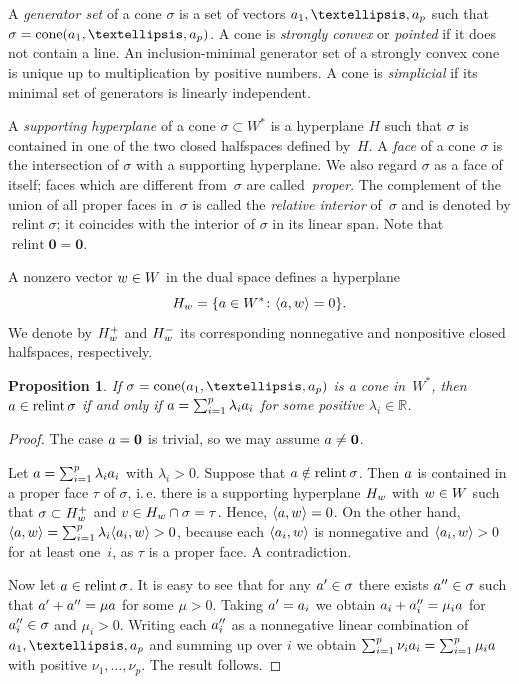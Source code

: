 \documentclass[a4paper]{amsart}
\newtheorem{proposition}[theorem]{Proposition}
\theoremstyle{definition}
\theoremstyle{remark}
\numberwithin{equation}{section}
\def\R{\mathbb R}
\def\R{\mathbb R}
\newcommand{\mb}[1]{{\textbf {\textit#1}}}
\def\cone{\mathop{\mathrm{cone}}}
\def\relint{\mathop{\mathrm{relint}}}
\newcommand{\<}{\langle}
\renewcommand{\>}{\rangle}
\begin{document}
A \emph{generator set} of a cone $\sigma$ is a set of vectors $\mb a_1,\ldots,\mb a_p$ such that $\sigma=\cone(\mb a_1,\ldots,\mb a_p)$. A cone is \emph{strongly convex} or \emph{pointed} if it does not contain a line.  An inclusion-minimal generator set of a strongly convex cone is unique up to multiplication by positive numbers. A cone is \emph{simplicial} if its minimal set of generators is linearly independent.

A \emph{supporting hyperplane} of a cone $\sigma\subset W^*$ is a hyperplane $H$ such that $\sigma$ is contained in one of the two closed halfspaces defined by~$H$. A \emph{face} of a cone $\sigma$ is the intersection of $\sigma$ with a supporting hyperplane. We also regard $\sigma$ as a face of itself; faces which are different from~$\sigma$ are called~\emph{proper}. The complement of the union of all proper faces in~$\sigma$ is called the \emph{relative interior} of~$\sigma$ and is denoted by $\relint\sigma$; it coincides with the interior of $\sigma$ in its linear span.
Note that $\relint{\mathbf 0}=\mathbf 0$.

A nonzero vector $\mb w\in W$ in the dual space defines a hyperplane
\[
  H_{\mb w}=\{\mb a\in W^*\colon\langle\mb a,\mb w\rangle=0\}.
\]   
We denote by $H_{\mb w}^+$ and $H_{\mb w}^-$ its corresponding nonnegative and nonpositive closed halfspaces, respectively. %

\begin{proposition}\label{positive}
If $\sigma=\cone(\mb a_1,\ldots,\mb a_p)$ is a cone in~$W^*$, then $\mb a\in\relint\sigma$ if and only if $\mb a=\sum_{i=1}^p \lambda_i\mb a_i$ for some positive $\lambda_i\in\R$.
\end{proposition}
\begin{proof}
The case $\mb a=\mathbf0$ is trivial, so we may assume $\mb a\ne\mathbf 0$.

Let $\mb a=\sum_{i=1}^p \lambda_i\mb a_i$ with $\lambda_i>0$. Suppose that $\mb a\notin\relint\sigma$. Then $\mb a$ is contained in a proper face $\tau$ of $\sigma$, i.\,e. there is a supporting hyperplane $H_{\mb w}$ with $\mb w\in W$ such that 
$\sigma\subset H_{\mb w}^+$ and $\mb v\in H_{\mb w}\cap\sigma=\tau$. Hence, $\langle\mb a,\mb w\rangle=0$. On the other hand, $\langle\mb a,\mb w\rangle=\sum_{i=1}^p \lambda_i\langle\mb a_i,\mb w\rangle>0$, because each $\langle\mb a_i,\mb w\rangle$ is nonnegative and $\langle\mb a_i,\mb w\rangle>0$ for at least one~$i$, as $\tau$ is a proper face. A contradiction.

Now let $\mb a\in\relint\sigma$. It is easy to see that for any $\mb a'\in\sigma$ there exists $\mb a''\in\sigma$ such that $\mb a'+\mb a''=\mu\mb a$ for some $\mu>0$. Taking $\mb a'=\mb a_i$ we obtain
$\mb a_i+\mb a''_i=\mu_i\mb a$ for $\mb a''_i\in\sigma$ and $\mu_i>0$. Writing each $\mb a''_i$ as a nonnegative linear combination of $\mb a_1,\ldots,\mb a_p$ and summing up over $i$ we obtain
$\sum_{i=1}^p\nu_i\mb a_i=\sum_{i=1}^p\mu_i\mb a$ with positive $\nu_1,\ldots,\nu_p$. The result follows.
\end{proof}
\end{document}
